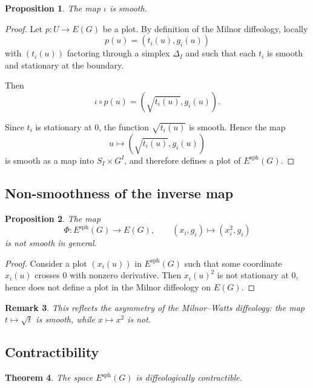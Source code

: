 \documentclass[11pt]{amsart}
\newtheorem{theorem}{Theorem}[section]
\newtheorem{proposition}[theorem]{Proposition}
\newtheorem{remark}[theorem]{Remark}
\begin{document}
\begin{proposition}
The map $\iota$ is smooth.
\end{proposition}

\begin{proof}
Let $p:U\to E(G)$ be a plot. By definition of the Milnor diffeology, locally
\[
p(u) = (t_i(u),g_i(u))
\]
with $(t_i(u))$ factoring through a simplex $\Delta_I$ and such that each $t_i$ is smooth and stationary at the boundary.

Then
\[
\iota \circ p(u) = (\sqrt{t_i(u)},g_i(u)).
\]

Since $t_i$ is stationary at $0$, the function $\sqrt{t_i(u)}$ is smooth. Hence the map
\[
u \mapsto (\sqrt{t_i(u)},g_i(u))
\]
is smooth as a map into $S_I \times G^I$, and therefore defines a plot of $E^{\mathrm{sph}}(G)$.
\end{proof}

\subsection{Non-smoothness of the inverse map}

\begin{proposition}
The map
\[
\Phi : E^{\mathrm{sph}}(G) \to E(G),
\qquad
(x_i,g_i) \mapsto (x_i^2,g_i)
\]
is not smooth in general.
\end{proposition}

\begin{proof}
Consider a plot $(x_i(u))$ in $E^{\mathrm{sph}}(G)$ such that some coordinate $x_i(u)$ crosses $0$ with nonzero derivative. Then $x_i(u)^2$ is not stationary at $0$, hence does not define a plot in the Milnor diffeology on $E(G)$.
\end{proof}

\begin{remark}
This reflects the asymmetry of the Milnor--Watts diffeology: the map $t \mapsto \sqrt{t}$ is smooth, while $x \mapsto x^2$ is not.
\end{remark}

\subsection{Contractibility}

\begin{theorem}
The space $E^{\mathrm{sph}}(G)$ is diffeologically contractible.
\end{theorem}
\end{document}
